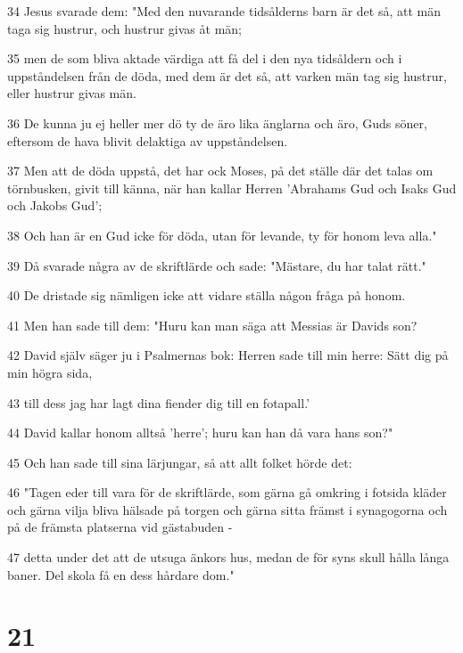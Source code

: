 \par 34 Jesus svarade dem: "Med den nuvarande tidsålderns barn är det så, att män taga sig hustrur, och hustrur givas åt män;
\par 35 men de som bliva aktade värdiga att få del i den nya tidsåldern och i uppståndelsen från de döda, med dem är det så, att varken män tag sig hustrur, eller hustrur givas män.
\par 36 De kunna ju ej heller mer dö ty de äro lika änglarna och äro, Guds söner, eftersom de hava blivit delaktiga av uppståndelsen.
\par 37 Men att de döda uppstå, det har ock Moses, på det ställe där det talas om törnbusken, givit till känna, när han kallar Herren 'Abrahams Gud och Isaks Gud och Jakobs Gud';
\par 38 Och han är en Gud icke för döda, utan för levande, ty för honom leva alla."
\par 39 Då svarade några av de skriftlärde och sade: "Mästare, du har talat rätt."
\par 40 De dristade sig nämligen icke att vidare ställa någon fråga på honom.
\par 41 Men han sade till dem: "Huru kan man säga att Messias är Davids son?
\par 42 David själv säger ju i Psalmernas bok: Herren sade till min herre: Sätt dig på min högra sida,
\par 43 till dess jag har lagt dina fiender dig till en fotapall.'
\par 44 David kallar honom alltså 'herre'; huru kan han då vara hans son?"
\par 45 Och han sade till sina lärjungar, så att allt folket hörde det:
\par 46 "Tagen eder till vara för de skriftlärde, som gärna gå omkring i fotsida kläder och gärna vilja bliva hälsade på torgen och gärna sitta främst i synagogorna och på de främsta platserna vid gästabuden -
\par 47 detta under det att de utsuga änkors hus, medan de för syns skull hålla långa baner. Del skola få en dess hårdare dom."

\chapter{21}

